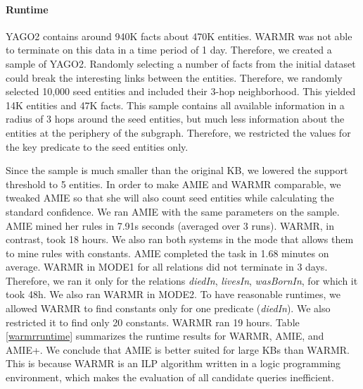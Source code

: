 {\paragraph{Runtime}
YAGO2\cite{yago2} contains around 940K facts about 470K entities.
WARMR was not able to terminate on this data in a time period of 1 day. Therefore, we created a sample of YAGO2.
Randomly selecting a number of facts from the initial dataset could break the interesting links between the entities.
Therefore, we randomly selected 10,000 seed entities and included their 3-hop neighborhood.
This yielded 14K entities and 47K facts.
This sample contains all available information in a radius of 3 hops around the seed entities, but much less information about the entities at the periphery of the subgraph.
Therefore, we restricted the values for the key predicate
to the seed entities only.

Since the sample is much smaller than the original KB, we lowered the support threshold to 5 entities.
In order to make AMIE and WARMR comparable, we tweaked AMIE so that she will also count seed entities while calculating the standard confidence.
We ran AMIE with the same parameters on the sample. AMIE mined her rules in 7.91s seconds (averaged over 3 runs).
WARMR, in contrast, took 18 hours.
We also ran both systems in the mode that allows them to mine rules with constants. AMIE completed the task in 1.68 minutes on average. WARMR in MODE1 for all relations did not terminate in 3 days.
Therefore, we ran it only for the relations \textit{diedIn}, \textit{livesIn}, \textit{wasBornIn}, for which it took 48h. We also ran WARMR in MODE2.
To have reasonable runtimes, we allowed WARMR to find constants only for one predicate (\emph{diedIn}). We also restricted it to find only 20 constants. WARMR ran 19 hours.
Table \ref{warmrruntime} summarizes the runtime results for WARMR, AMIE, and AMIE+. We conclude that AMIE is better suited for large KBs than WARMR.
This is because WARMR is an ILP algorithm written in a logic programming environment, which makes the evaluation of all candidate queries inefficient.\\



}

